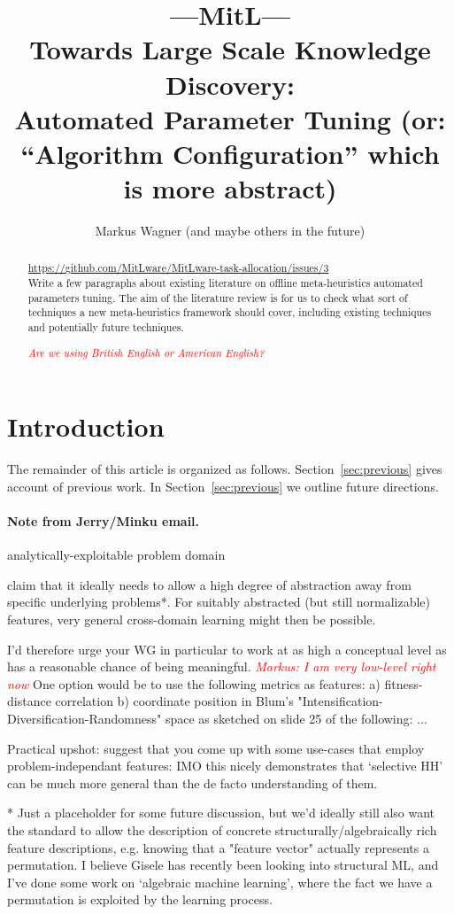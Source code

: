 \documentclass{article}
\title{---MitL---\\Towards Large Scale Knowledge Discovery:\\ Automated Parameter Tuning (or: ``Algorithm Configuration'' which is more abstract)}
\author{Markus Wagner (and maybe others in the future)
}
\date{}
\newcommand{\remark}[1]{\textcolor{red}{\em #1}}
\begin{document}
\maketitle

\begin{abstract}
\noindent\url{https://github.com/MitLware/MitLware-task-allocation/issues/3}\\
Write a few paragraphs about existing literature on offline meta-heuristics automated parameters tuning. The aim of the literature review is for us to check what sort of techniques a new meta-heuristics framework should cover, including existing techniques and potentially future techniques.

\remark{Are we using British English or American English?}
\end{abstract}

\section{Introduction}

The remainder of this article is organized as follows.
Section~\ref{sec:previous} gives account of previous work.
In Section~\ref{sec:previous} we outline future directions.


\paragraph{Note from Jerry/Minku email.}
analytically-exploitable problem domain

claim that it ideally needs
to allow a high degree of abstraction away from specific underlying
problems*. For suitably abstracted (but still normalizable) features,
very general cross-domain learning might then be possible. 

I'd therefore urge your WG in particular to work at as high a conceptual
level as has a reasonable chance of being meaningful. 
\remark{Markus: I am very low-level right now} 
One option would
be to use the following metrics as features: a) fitness-distance
correlation b) coordinate position in Blum's
"Intensification-Diversification-Randomness" space as sketched on slide
25 of the following: ...

Practical upshot: suggest that you come up with some use-cases that
employ problem-independant features: IMO this nicely demonstrates that
`selective HH' can be much more general than the de facto understanding
of them. 

*  Just a placeholder for some future discussion, but we'd ideally still
also want the standard to allow the description of concrete
structurally/algebraically rich feature descriptions, e.g. knowing
that a "feature vector" actually represents a permutation. I believe
Gisele has recently been looking into structural ML, and I've done some
work on `algebraic machine learning', where the fact we have a
permutation is exploited by the learning process. 
\end{document}
